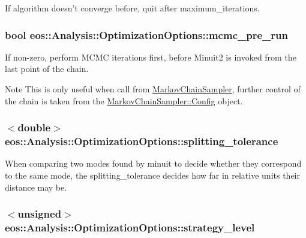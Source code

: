 \label{structeos_1_1Analysis_1_1OptimizationOptions_aa1ec8a9c5e6325a3b090423eb76deda9}
If algorithm doesn't converge before, quit after maximum\_\-iterations. \hypertarget{structeos_1_1Analysis_1_1OptimizationOptions_a6ae3c50f21c85e0c94135b4c68259c2e}{
\subsubsection[{mcmc\_\-pre\_\-run}]{\setlength{\rightskip}{0pt plus 5cm}bool {\bf eos::Analysis::OptimizationOptions::mcmc\_\-pre\_\-run}}}
\label{structeos_1_1Analysis_1_1OptimizationOptions_a6ae3c50f21c85e0c94135b4c68259c2e}
If non-\/zero, perform MCMC iterations first, before Minuit2 is invoked from the last point of the chain.

\begin{DoxyNote}{Note}
This is only useful when call from \hyperlink{classeos_1_1MarkovChainSampler}{MarkovChainSampler}, further control of the chain is taken from the \hyperlink{classeos_1_1MarkovChainSampler_1_1Config}{MarkovChainSampler::Config} object. 
\end{DoxyNote}
\hypertarget{structeos_1_1Analysis_1_1OptimizationOptions_a42f80d457baa1e7e325e40696d2d1bbe}{
\subsubsection[{splitting\_\-tolerance}]{$<$double$>$ {\bf eos::Analysis::OptimizationOptions::splitting\_\-tolerance}}}
\label{structeos_1_1Analysis_1_1OptimizationOptions_a42f80d457baa1e7e325e40696d2d1bbe}
When comparing two modes found by minuit to decide whether they correspond to the same mode, the splitting\_\-tolerance decides how far in relative units their distance may be. \hypertarget{structeos_1_1Analysis_1_1OptimizationOptions_ad31144d330b6897a432d0a02f1ebe027}{
\subsubsection[{strategy\_\-level}]{$<$unsigned$>$ {\bf eos::Analysis::OptimizationOptions::strategy\_\-level}}}
\label{structeos_1_1Analysis_1_1OptimizationOptions_ad31144d330b6897a432d0a02f1ebe027}


